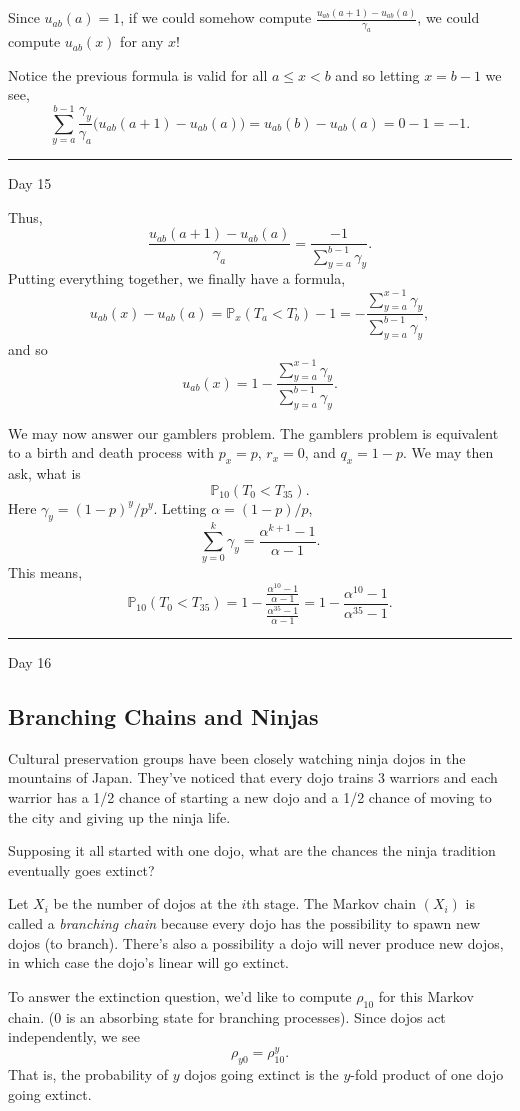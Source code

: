 \documentclass{problemset}
\renewcommand{\P}{\mathbb{P}}
\newcommand{\fatrule}[1]{\vspace{.3cm}\hrule {\hfill \sf #1}\par}
\begin{document}
	Since $u_{ab}(a)=1$, if we could somehow compute $\frac{u_{ab}(a+1)-u_{ab}(a)}{\gamma_a}$, we could compute $u_{ab}(x)$ for any $x$!

	Notice the previous formula is valid for all $a\leq x<b$ and so letting $x=b-1$ we see,
	\[
		\sum_{y=a}^{b-1} \frac{\gamma_y}{\gamma_a}\Big(u_{ab}(a+1)-u_{ab}(a)\Big)
		=u_{ab}(b)-u_{ab}(a) = 0-1=-1.
	\]

	\fatrule{Day 15}
	Thus, 
	\[
		\frac{u_{ab}(a+1)-u_{ab}(a)}{\gamma_a} = \frac{-1}{\displaystyle \sum_{y=a}^{b-1} \gamma_y}.
	\]
	Putting everything together, we finally have a formula,
	\[
		u_{ab}(x) - u_{ab}(a) = \P_x(T_a<T_b)-1 = -\frac{\sum_{y=a}^{x-1} \gamma_y}{\sum_{y=a}^{b-1}\gamma_y},
	\]
	and so
	\[
		u_{ab}(x)  = 1-\frac{\sum_{y=a}^{x-1} \gamma_y}{\sum_{y=a}^{b-1}\gamma_y}.
	\]


	\vspace{.5cm}
	We may now answer our gamblers problem.  The gamblers problem is equivalent to a birth and death 
	process with $p_x=p$, $r_x=0$, and $q_x=1-p$.  We may then ask, what is
	\[
		\P_{10}(T_0 < T_{35}).
	\]
	Here $\gamma_y = (1-p)^y/p^y$.  Letting $\alpha = (1-p)/p$,
	\[
		\sum_{y=0}^{k} \gamma_y = \frac{\alpha^{k+1}-1}{\alpha-1}.
	\]
	This means,
	\[
		\P_{10}(T_0 < T_{35}) = 1-\frac{\frac{\alpha^{10}-1}{\alpha-1}}  {\frac{\alpha^{35}-1}{\alpha-1}} = 1-\frac{\alpha^{10}-1}{\alpha^{35}-1}.
	\]

	\fatrule{Day 16}
\subsection*{Branching Chains and Ninjas}

	Cultural preservation groups have been closely
	watching ninja dojos in the mountains of Japan.
	They've noticed that every dojo trains 3 warriors and
	each warrior has a 1/2 chance of starting a new
	dojo and a 1/2 chance of moving to the city and giving
	up the ninja life.

	Supposing it all started with one dojo, what are the chances
	the ninja tradition eventually goes extinct?

	Let $X_i$ be the number of dojos
	at the $i$th stage.  The Markov chain $(X_i)$ is called
	a \emph{branching chain} because every dojo has the possibility to
	spawn new dojos (to branch).  There's also a possibility a dojo will
	never produce new dojos, in which case the dojo's linear will go extinct.

	To answer the extinction question, we'd like to compute $\rho_{10}$ for this Markov chain.
	($0$ is an absorbing state for branching processes).  Since dojos act independently, we see
	\[
		\rho_{y0} = \rho_{10}^y.
	\]
	That is, the probability of $y$ dojos going extinct is the $y$-fold product of 
	one dojo going extinct.
\end{document}
